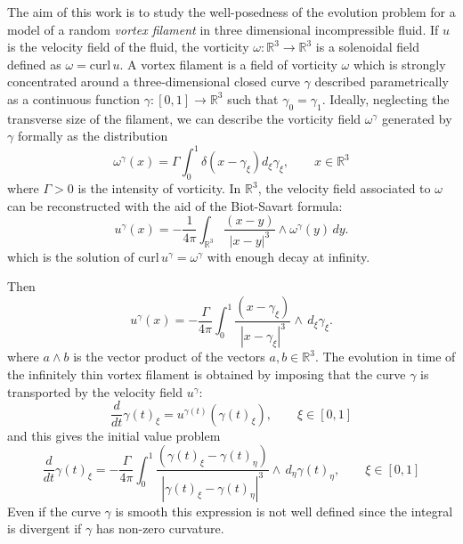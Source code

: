 \documentclass[a4paper,12pt,reqno]{amsart}
\newcommand{\R}{\mathbb{R}}
\begin{document}
The aim of this work is to study the well-posedness of the evolution
problem for a model of a random \emph{vortex filament} in
three dimensional incompressible fluid. If $u$ is the velocity field
of the fluid, the vorticity $\omega : \mathbb{R}^3 \to \mathbb{R}^3$
is a solenoidal field defined as $\omega = \text{curl}\, u$. 
A vortex filament is a field of vorticity $\omega$  
which is strongly concentrated around a three-dimensional closed curve
$\gamma$ described parametrically as a continuous function $\gamma :
[0,1] \to \mathbb{R}^3$ such that $\gamma_0 = \gamma_1$. Ideally, neglecting the transverse size of
the filament, we can describe the vorticity field $\omega^\gamma$
generated by $\gamma$ formally as the distribution
\begin{equation}\label{formal}
  \omega^\gamma(x)=\Gamma\int_0^1\delta(x-\gamma_\xi) d_\xi \gamma_\xi,
  \qquad x \in\mathbb{R}^3
\end{equation}
where $\Gamma > 0$ is the intensity of vorticity. In
$\mathbb{R}^3$, the velocity field associated to $\omega$ can be
reconstructed with the aid of the Biot-Savart formula:
\begin{equation}\label{biot-savart}
u^\gamma(x)=-\frac{1}{4\pi} \int_{\R^3}\frac{(x-y)}{|x-y|^3}\wedge \omega^\gamma( y)\,d y.
\end{equation}
which is the solution of $\text{curl}\, u^\gamma = \omega^\gamma$ with
enough decay at infinity.

Then
\begin{equation}\label{biot-savart2}
u^\gamma(x)=-\frac{\Gamma}{4\pi}
\int_0^1\frac{(x-\gamma_\xi)}{|x-\gamma_\xi|^3}\wedge \, d_\xi \gamma_\xi.
\end{equation}
where $a \wedge b$ is the vector product of the vectors $a,b \in
\mathbb{R}^3$. The evolution in time of the infinitely thin vortex filament is
obtained by imposing that the curve $\gamma$ is transported by the
velocity field $u^\gamma$:
\begin{equation}
  \label{eq:evolution1}
 \frac{d}{dt} \gamma(t)_\xi = u^{\gamma(t)}(\gamma(t)_\xi)
, \qquad \xi
 \in [0,1]  
\end{equation}
and this gives the initial value problem
\begin{equation}
  \label{eq:evolution2}
 \frac{d}{dt} \gamma(t)_\xi 
= -\frac{\Gamma}{4\pi}
\int_0^1\frac{(\gamma(t)_\xi-\gamma(t)_\eta)}{|\gamma(t)_\xi-\gamma(t)_\eta|^3}\wedge \, d_\eta \gamma(t)_\eta
, \qquad \xi
 \in [0,1]  
\end{equation}
Even if the curve $\gamma$ is smooth this expression is not well
defined since the integral is divergent if $\gamma$ has non-zero
curvature. 
 
\end{document}
